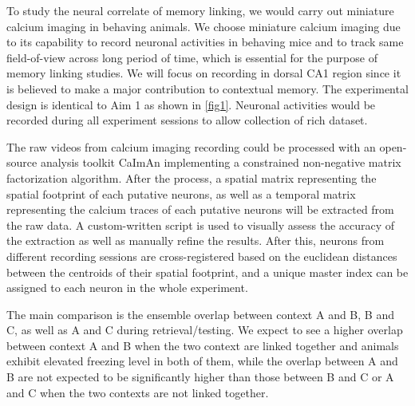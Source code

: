 \documentclass[master.tex]{subfiles}
\begin{document}
To study the neural correlate of memory linking, we would carry out miniature
calcium imaging in behaving animals. We choose miniature calcium imaging due to
its capability to record neuronal activities in behaving mice and to track same
field-of-view across long period of time, which is essential for the purpose of
memory linking studies. We will focus on recording in dorsal CA1 region since it
is believed to make a major contribution to contextual memory. The experimental
design is identical to Aim 1 as shown in \autoref{fig1}. Neuronal activities
would be recorded during all experiment sessions to allow collection of rich
dataset.

The raw videos from calcium imaging recording could be processed with an
open-source analysis toolkit CaImAn implementing a constrained non-negative
matrix factorization algorithm. After the process, a spatial matrix representing
the spatial footprint of each putative neurons, as well as a temporal matrix
representing the calcium traces of each putative neurons will be extracted from
the raw data. A custom-written script is used to visually assess the accuracy of
the extraction as well as manually refine the results. After this, neurons from
different recording sessions are cross-registered based on the euclidean
distances between the centroids of their spatial footprint, and a unique master
index can be assigned to each neuron in the whole experiment.

The main comparison is the ensemble overlap between context A and B, B and C, as
well as A and C during retrieval/testing. We expect to see a higher overlap
between context A and B when the two context are linked together and animals
exhibit elevated freezing level in both of them, while the overlap between A and
B are not expected to be significantly higher than those between B and C or A
and C when the two contexts are not linked together.
\end{document}

